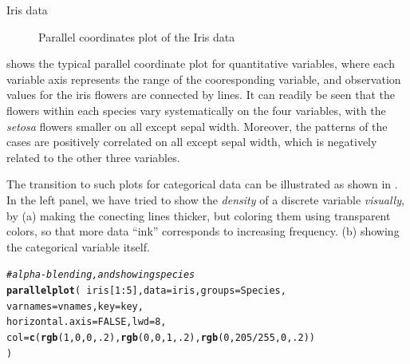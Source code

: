 \documentclass[11pt]{book}\usepackage[]{graphicx}\usepackage[]{color}
\makeatletter
\newcommand{\hlnum}[1]{\textcolor[rgb]{0.686,0.059,0.569}{#1}}%
\newcommand{\hlcom}[1]{\textcolor[rgb]{0.678,0.584,0.686}{\textit{#1}}}%
\newcommand{\hlopt}[1]{\textcolor[rgb]{0,0,0}{#1}}%
\newcommand{\hlstd}[1]{\textcolor[rgb]{0.345,0.345,0.345}{#1}}%
\newcommand{\hlkwc}[1]{\textcolor[rgb]{0.333,0.667,0.333}{#1}}%
\newcommand{\hlkwd}[1]{\textcolor[rgb]{0.737,0.353,0.396}{\textbf{#1}}}%
\newenvironment{kframe}{%
 \def\at@end@of@kframe{}%
 \ifinner\ifhmode%
  \def\at@end@of@kframe{\end{minipage}}%
  \begin{minipage}{\columnwidth}%
 \fi\fi%
 \def\FrameCommand##1{\hskip\@totalleftmargin \hskip-\fboxsep
 \colorbox{shadecolor}{##1}\hskip-\fboxsep
     \hskip-\linewidth \hskip-\@totalleftmargin \hskip\columnwidth}%
 \MakeFramed {\advance\hsize-\width
   \@totalleftmargin\z@ \linewidth\hsize
   \@setminipage}}%
 {\par\unskip\endMakeFramed%
 \at@end@of@kframe}
\newenvironment{knitrout}{}{} %
\renewenvironment{knitrout}{\small\renewcommand{\baselinestretch}{.85}}{} %
\makeatother
\begin{document}
\begin{Example}[iris1]{Iris data}
\begin{knitrout}
\begin{figure}[htbp]
\caption[Parallel coordinates plot of the Iris data]{Parallel coordinates plot of the Iris data\label{fig:iris1}}
\end{figure}


\end{knitrout}

 shows the typical parallel coordinate plot for quantitative
variables, where each variable axis represents the range of the cooresponding variable,
and observation values for the iris flowers are connected by lines.
It can readily be seen that the flowers within each species vary systematically
on the four variables, with the \emph{setosa} flowers smaller on all except
sepal width.  Moreover, the patterns of the cases are positively correlated
on all except sepal width, which is negatively related to the other three variables.

The transition to such plots for categorical data can be illustrated as shown in
.  In the left panel, we have tried to show the \emph{density}
of a discrete variable \emph{visually}, by 
(a) making the conecting lines thicker, but coloring them using transparent
colors, so that more data ``ink'' corresponds to increasing frequency.
(b) showing the categorical variable  itself.

\begin{knitrout}
\color{fgcolor}\begin{kframe}
\begin{alltt}
\hlcom{# alpha-blending, and showing species}
\hlkwd{parallelplot}\hlstd{(}\hlopt{~}\hlstd{iris[}\hlnum{1}\hlopt{:}\hlnum{5}\hlstd{],} \hlkwc{data}\hlstd{=iris,} \hlkwc{groups} \hlstd{= Species,}
  \hlkwc{varnames} \hlstd{= vnames,} \hlkwc{key} \hlstd{= key,}
  \hlkwc{horizontal.axis} \hlstd{=} \hlnum{FALSE}\hlstd{,} \hlkwc{lwd}\hlstd{=}\hlnum{8}\hlstd{,}
  \hlkwc{col}\hlstd{=}\hlkwd{c}\hlstd{(}\hlkwd{rgb}\hlstd{(}\hlnum{1}\hlstd{,}\hlnum{0}\hlstd{,}\hlnum{0}\hlstd{,}\hlnum{.2}\hlstd{),} \hlkwd{rgb}\hlstd{(}\hlnum{0}\hlstd{,}\hlnum{0}\hlstd{,}\hlnum{1}\hlstd{,}\hlnum{.2}\hlstd{),} \hlkwd{rgb}\hlstd{(}\hlnum{0}\hlstd{,}\hlnum{205}\hlopt{/}\hlnum{255}\hlstd{,}\hlnum{0}\hlstd{,}\hlnum{.2}\hlstd{) )}
  \hlstd{)}
\end{alltt}
\end{kframe}
\end{knitrout}


\end{Example}
\end{document}
